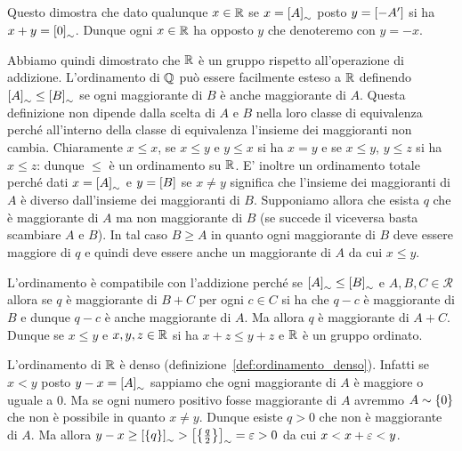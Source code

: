 Questo dimostra che dato qualunque $x\in {\mathbb R}$ se $x={\left[ A \right]}_\sim$
posto $y={\left[ -A' \right]}$ si ha $x+y={\left[ 0 \right]}_\sim$.
Dunque ogni $x\in {\mathbb R}$ ha opposto $y$ che denoteremo 
con $y=-x$.

Abbiamo quindi dimostrato che ${\mathbb R}$ è un gruppo rispetto all'operazione 
di addizione. L'ordinamento di ${\mathbb Q}$ può essere facilmente esteso a ${\mathbb R}$
definendo ${\left[ A \right]}_\sim \le {\left[ B \right]}_\sim$ se ogni maggiorante di $B$ 
è anche maggiorante di $A$. Questa definizione non dipende dalla scelta 
di $A$ e $B$ nella loro classe di equivalenza perché all'interno della classe di 
equivalenza l'insieme dei maggioranti 
non cambia.
Chiaramente $x\le x$, se $x\le y$ e $y\le x$ si ha $x=y$ 
e se $x\le y$, $y\le z$ si ha $x\le z$: dunque $\le$ è un ordinamento su ${\mathbb R}$.
E' inoltre un ordinamento totale perché dati $x={\left[ A \right]}_\sim$ e 
$y={\left[ B \right]}$ se $x\neq y$ significa che l'insieme dei maggioranti 
di $A$ è diverso dall'insieme dei maggioranti di $B$. 
Supponiamo allora che esista $q$ che è maggiorante di $A$ 
ma non maggiorante di $B$ (se succede il viceversa basta scambiare $A$ e $B$).
In tal caso $B\ge A$ in quanto ogni maggiorante di $B$ deve essere maggiore 
di $q$ e quindi deve essere anche un maggiorante di $A$ da cui $x\le y$. 

L'ordinamento è compatibile con l'addizione perché se ${\left[ A \right]}_\sim 
\le {\left[ B \right]}_\sim$ e $A,B,C\in \mathcal R$ 
allora se $q$ è maggiorante di $B+C$ per ogni $c\in C$ si ha che $q-c$ 
è maggiorante di $B$ e dunque $q-c$ è anche maggiorante di $A$.
Ma allora $q$ è maggiorante di $A+C$. Dunque se $x\le y$ e $x,y,z\in {\mathbb R}$ 
si ha $x+z\le y+z$ e ${\mathbb R}$ è un gruppo ordinato.

L'ordinamento di ${\mathbb R}$ è denso (definizione~\ref{def:ordinamento_denso}). 
Infatti se $x<y$ posto $y-x={\left[ A \right]}_\sim$ 
sappiamo che ogni maggiorante di $A$ è maggiore o uguale a $0$.
Ma se ogni numero positivo fosse maggiorante di $A$ avremmo $A\sim{\left\{ 0 \right\}}$
che non è possibile in quanto $x\neq y$. Dunque esiste $q>0$ 
che non è maggiorante di $A$. 
Ma allora $y-x \ge {\left[ {\left\{ q \right\}} \right]}_\sim > {\left[ {\left\{ \frac q 2 \right\}} \right]}_\sim = \varepsilon > 0$
da cui $x<x+\varepsilon<y$.

